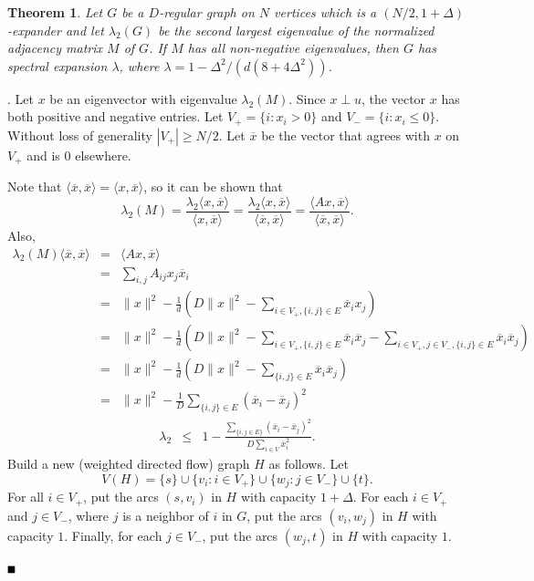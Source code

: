 \documentclass{article}
\newtheorem{theorem}{Theorem}[section]
\newcommand{\bproof}{\noindent{\bf Proof}}
\newcommand{\eproof}{\hspace*{\fill}$\rule{2mm}{2mm}$~~~~\bigskip}
\renewenvironment{proof}{\bproof. }{\eproof}
\begin{document}
\begin{theorem}\label{bipartiteverteximpliesspectral}
Let $G$ be a $D$-regular graph on $N$ vertices which is a $(N/2,1+\Delta )$-expander and let $\lambda_2(G)$ be the second largest eigenvalue of the normalized adjacency matrix $M$ of $G$. If $M$ has all non-negative eigenvalues, then $G$ has spectral expansion $\lambda$, where $\lambda =1-\Delta^2/(d(8+4\Delta^2))$.
\end{theorem}
\begin{proof}
Let $x$ be an eigenvector with eigenvalue $\lambda_2(M)$. Since $x\perp u$, the vector $x$ has both positive and negative entries. Let $V_+=\{i:x_i>0\}$ and $V_-=\{i:x_i\leq 0\}$. Without loss of generality $|V_+|\geq N/2$. Let $\overline{x}$ be the vector that agrees with $x$ on $V_+$ and is $0$ elsewhere.

Note that $\langle \overline{x},\overline{x}\rangle =\langle x,\overline{x}\rangle$, so it can be shown that
\[
\lambda_2(M)=\frac{\lambda_2\langle x,\overline{x}\rangle}{\langle x,\overline{x}\rangle}=\frac{\lambda_2\langle x,\overline{x}\rangle}{\langle\overline{x},\overline{x}\rangle}=\frac{\langle Ax,\overline{x}\rangle}{\langle\overline{x},\overline{x}\rangle}.
\]
Also,
\begin{eqnarray*}
\lambda_2(M)\langle\overline{x},\overline{x}\rangle & = & \langle Ax,\overline{x}\rangle\\
 & = & \sum_{i,j}A_{ij}x_j\overline{x}_i\\
 & = & \| x\|^2-\frac{1}{d}\left (D\| x\|^2-\sum_{i\in V_+,\{ i,j\}\in E}\overline{x}_ix_j\right )\\
 & = & \| x\|^2-\frac{1}{d}\left (D\| x\|^2-\sum_{i\in V_+,\{ i,j\}\in E}\overline{x}_i\overline{x}_j-\sum_{i\in V_+,j\in V_-,\{ i,j\}\in E}\overline{x}_i\overline{x}_j\right )\\
 & = & \| x\|^2-\frac{1}{d}\left (D\| x\|^2-\sum_{\{ i,j\}\in E}\overline{x}_i\overline{x}_j\right )\\
 & = & \| x\|^2-\frac{1}{D}\sum_{\{ i,j\}\in E} (\overline{x}_i-\overline{x}_j)^2
\end{eqnarray*}
\begin{eqnarray}\label{maxflowmincutlambdaequation}
\lambda_2 & \leq & 1-\frac{\sum_{\{ i,j\in E \}}(\overline{x}_i-\overline{x}_j)^2}{D\sum_{i\in V}\overline{x}_i^2}.
\end{eqnarray}
Build a new (weighted directed flow) graph $H$ as follows. Let
\[
V(H)=\{ s\}\cup\{ v_i:i\in V_+\}\cup\{w_j:j\in V_-\}\cup\{ t\}.
\]
For all $i\in V_+$, put the arcs $(s,v_i)$ in $H$ with capacity $1+\Delta$. For each $i\in V_+$ and $j\in V_-$, where $j$ is a neighbor of $i$ in $G$, put the arcs $(v_i,w_j)$ in $H$ with capacity $1$. Finally, for each $j\in V_-$, put the arcs $(w_j,t)$ in $H$ with capacity $1$.


\end{proof}
\end{document}
